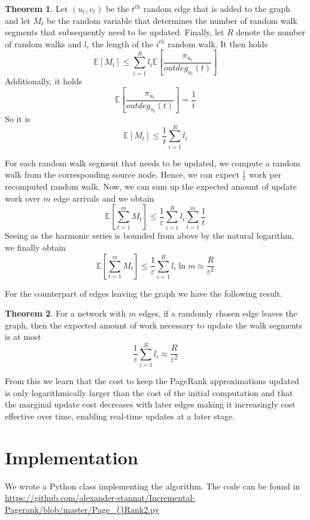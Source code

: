 \documentclass[twocolumn]{article}
\theoremstyle{definition}
\theoremstyle{theorem}
\newtheorem{theorem}{Theorem}[section]
\begin{document}
\begin{theorem}
Let $(u_t, v_t)$ be the $t^{th}$ random edge that is added to the graph and let $M_t$ be the random variable that determines the number of random walk segments that subsequently need to be updated. Finally, let $R$ denote the number of random walks and $l_i$ the length of the $i^{th}$ random walk. It then holds 
\[
\mathbb{E}[M_t] \leq \sum_{i=1}^{R}l_i\mathbb{E}[\frac{\pi_{u_t}}{outdeg_{u_t}(t)}] 
\]
Additionally, it holds 
\[
\mathbb{E}[\frac{\pi_{u_t}}{outdeg_{u_t}(t)}] = \frac{1}{t} 
\]
So it is
\[
\mathbb{E}[M_t] \leq \frac{1}{t}\sum_{i=1}^{R}l_i 
\]

\noindent For each random walk segment that needs to be updated, we compute a random walk from the corresponding source node. Hence, we can expect $\frac{1}{c}$ work per recomputed random walk. Now, we can sum up the expected amount of update work over $m$ edge arrivals and we obtain
\[
\mathbb{E}[\sum_{t=1}^{m}M_t] \leq \frac{1}{\varepsilon}\sum_{i=1}^{R}l_i \sum_{t=1}^{m}\frac{1}{t}
\]
Seeing as the harmonic series is bounded from above by the natural logarithm, we finally obtain
\[
\mathbb{E}[\sum_{t=1}^{m}M_t]\leq\frac{1}{\varepsilon}\sum_{i=1}^{R}l_i \ln{m} \approx \frac{R}{\varepsilon^2}
\]
\end{theorem}
For the counterpart of edges leaving the graph we have the following result.
\begin{theorem}
\noindent For a network with $m$ edges, if a randomly chosen edge leaves the graph, then the expected amount of work necessary to update the walk segments is at most
\[
\frac{1}{\varepsilon}\sum_{i=1}^{R}l_i\approx\frac{R}{\varepsilon^2}
\]
\end{theorem}
\noindent From this we learn that the cost to keep the PageRank approximations updated is only logarithmically larger than the cost of the initial computation and that the marginal update cost decreases with later edges making it increasingly cost effective over time, enabling real-time updates at a later stage.

\section{Implementation}
\label{sec:Implementation}
We wrote a Python class implementing the algorithm. The code can be found in \url{https://github.com/alexander-stannat/Incremental-Pagerank/blob/master/Page\_{}Rank2.py}
\end{document}
